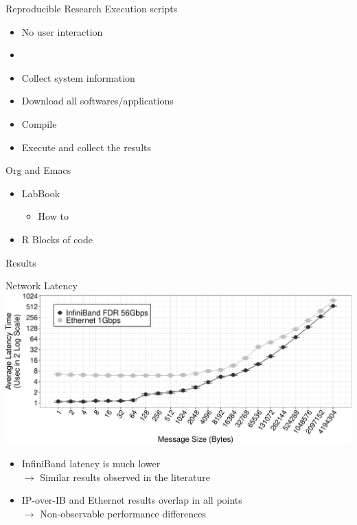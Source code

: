 \documentclass{beamer}
\begin{document}
\begin{frame}{Reproducible Research}
\vfill
Execution scripts
\begin{itemize}
    \item No user interaction
    \item 
    \item Collect system information
    \item Download all softwares/applications
    \item Compile
    \item Execute and collect the results
\end{itemize}

Org and Emacs
\begin{itemize}
    \item LabBook
    \begin{itemize}
        \item How to
    \end{itemize}
    \item R Blocks of code
\end{itemize}
\end{frame}


\begin{frame} 
\begin{block}{}
\begin{center}
\Huge{Results}
\end{center}
\end{block}
\end{frame}

\begin{frame}{Network Latency}
\includegraphics[width=\textwidth]{SLIDES/img/Latency.pdf}
\vfill\pause
\begin{itemize}
    \item InfiniBand latency is much lower\\
        $\to$ Similar results observed in the literature
    \item\pause IP-over-IB and Ethernet results overlap in all points\\
        $\to$ Non-observable performance differences
\end{itemize}
\end{frame}
\end{document}
